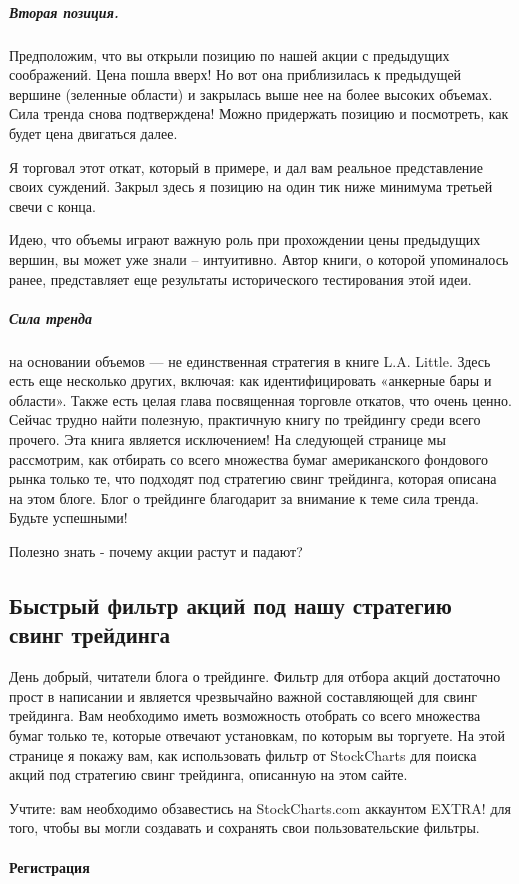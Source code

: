 \documentclass[a5paper]{article}
\begin{document}
\subparagraph{Вторая позиция.} Предположим, что вы открыли позицию по нашей акции с предыдущих соображений. Цена пошла вверх! Но вот она приблизилась к предыдущей вершине (зеленные области) и закрылась выше нее на более высоких объемах. Сила тренда снова подтверждена! Можно придержать позицию и посмотреть, как будет цена двигаться далее.

Я торговал этот откат, который в примере, и дал вам реальное представление своих суждений. Закрыл здесь я позицию на один тик ниже минимума третьей свечи с конца.

Идею, что объемы играют важную роль при прохождении цены предыдущих вершин, вы может уже знали – интуитивно. Автор книги, о которой упоминалось ранее, представляет еще результаты исторического тестирования этой идеи.

\subparagraph{Сила тренда} на основании объемов — не единственная стратегия в книге L.A. Little. Здесь есть еще несколько других, включая: как идентифицировать «анкерные бары и области». Также есть целая глава посвященная торговле откатов, что очень ценно. Сейчас трудно найти полезную, практичную книгу по трейдингу среди всего прочего. Эта книга является исключением! На следующей странице мы рассмотрим, как отбирать со всего множества бумаг американского фондового рынка только те, что подходят под стратегию свинг трейдинга, которая описана на этом блоге. Блог о трейдинге благодарит за внимание к теме сила тренда. Будьте успешными!


Полезно знать - почему акции растут и падают?

\subsection{Быстрый фильтр акций под нашу стратегию свинг трейдинга}

День добрый, читатели блога о трейдинге. Фильтр для отбора акций достаточно прост в написании и является чрезвычайно важной составляющей для свинг трейдинга. Вам необходимо иметь возможность отобрать со всего множества бумаг только те, которые отвечают установкам, по которым вы торгуете. На этой странице я покажу вам, как использовать фильтр от StockCharts для поиска акций под стратегию свинг трейдинга, описанную на этом сайте.

Учтите: вам необходимо обзавестись на StockCharts.com аккаунтом EXTRA!
для того, чтобы вы могли создавать и сохранять свои пользовательские
фильтры.

\paragraph{Регистрация}
\end{document}
